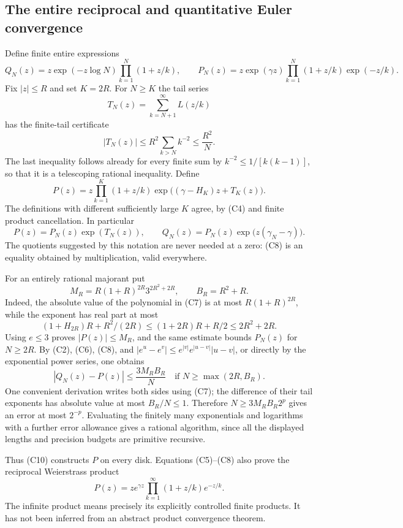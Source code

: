 \subsection{The entire reciprocal and quantitative Euler convergence}
Define finite entire expressions
\[
 Q_N(z)=z\exp(-z\log N)\prod_{k=1}^N(1+z/k),\qquad
 P_N(z)=z\exp(\gamma z)\prod_{k=1}^N(1+z/k)\exp(-z/k).
 \tag{C5}
\]
Fix $|z|\leq R$ and set $K=2R$.  For $N\geq K$ the tail series
\[
 T_N(z)=\sum_{k=N+1}^{\infty}L(z/k)
\]
has the finite-tail certificate
\[
 |T_N(z)|\leq R^2\sum_{k>N}k^{-2}\leq\frac{R^2}{N}.
 \tag{C6}
\]
The last inequality follows already for every finite sum by
$k^{-2}\leq1/[k(k-1)]$, so that it is a telescoping rational inequality.
Define
\[
 P(z)=z\prod_{k=1}^K(1+z/k)
       \exp\bigl((\gamma-H_K)z+T_K(z)\bigr).
 \tag{C7}
\]
The definitions with different sufficiently large $K$ agree, by (C4) and
finite product cancellation.  In particular
\[
 P(z)=P_N(z)\exp(T_N(z)),\qquad
 Q_N(z)=P_N(z)\exp\bigl(z(\gamma_N-\gamma)\bigr).
 \tag{C8}
\]
The quotients suggested by this notation are never needed at a zero: (C8)
is an equality obtained by multiplication, valid everywhere.

For an entirely rational majorant put
\[
 M_R=R(1+R)^{2R}3^{2R^2+2R},\qquad B_R=R^2+R.
 \tag{C9}
\]
Indeed, the absolute value of the polynomial in (C7) is at most
$R(1+R)^{2R}$, while the exponent has real part at most
\[
 (1+H_{2R})R+R^2/(2R)
 \leq (1+2R)R+R/2\leq2R^2+2R.
\]
Using $e\leq3$ proves $|P(z)|\leq M_R$, and the same estimate bounds
$P_N(z)$ for $N\geq2R$.  By (C2), (C6), (C8), and
$|e^u-e^v|\leq e^{|v|}e^{|u-v|}|u-v|$, or directly by the
exponential power series, one obtains
\[
 |Q_N(z)-P(z)|\leq \frac{3M_RB_R}{N}
 \quad\text{if }N\geq\max(2R,B_R).
 \tag{C10}
\]
One convenient derivation writes both sides using (C7); the difference
of their tail exponents has absolute value at most $B_R/N\leq1$.
Therefore $N\geq3M_RB_R2^p$ gives an error at most $2^{-p}$.
Evaluating the finitely many exponentials and logarithms with a further
error allowance gives a rational algorithm, since all the displayed
lengths and precision budgets are primitive recursive.

Thus (C10) constructs $P$ on every disk.  Equations (C5)--(C8) also prove
the reciprocal Weierstrass product
\[
 \boxed{\displaystyle
 P(z)=z e^{\gamma z}\prod_{k=1}^{\infty}(1+z/k)e^{-z/k}.}
 \tag{C11}
\]
The infinite product means precisely its explicitly controlled finite
products.  It has not been inferred from an abstract product convergence
theorem.


